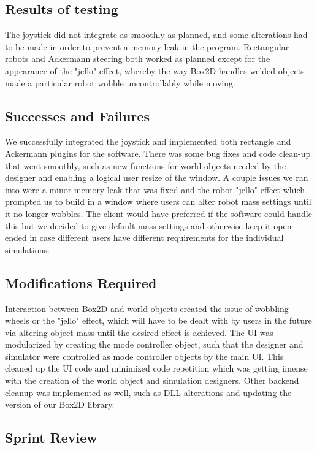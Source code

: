 \subsection{Results of testing}

The joystick did not integrate as smoothly as planned, and some alterations had to be made in order to prevent a memory leak in the program. Rectangular robots and Ackermann steering both worked as planned except for the appearance of the "jello" effect, whereby the way Box2D handles welded objects made a particular robot wobble uncontrollably while moving.

\subsection{Successes and Failures}

We successfully integrated the joystick and implemented both rectangle and Ackermann plugins for the software. There was some bug fixes and code clean-up that went smoothly, such as new functions for world objects needed by the designer and enabling a logical user resize of the window. A couple issues we ran into were a minor memory leak that was fixed and the robot "jello" effect which prompted us to build in a window where users can alter robot mass settings until it no longer wobbles. The client would have preferred if the software could handle this but we decided to give default mass settings and otherwise keep it open-ended in case different users have different requirements for the individual simulations.

\subsection{Modifications Required}

Interaction between Box2D and world objects created the issue of wobbling wheels or the "jello" effect, which will have to be dealt with by users in the future via altering object mass until the desired effect is achieved. The UI was modularized by creating the mode controller object, such that the designer and simulator were controlled as mode controller objects by the main UI. This cleaned up the UI code and minimized code repetition which was getting imense with the creation of the world object and simulation designers. Other backend cleanup was implemented as well, such as DLL alterations and updating the version of our Box2D library.

\subsection{Sprint Review}

